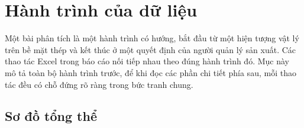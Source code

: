 \documentclass[12pt]{article}
\begin{document}
\clearpage
\section{Hành trình của dữ liệu}

Một bài phân tích là một hành trình có hướng, bắt đầu từ một hiện tượng vật lý trên bề mặt thép và kết thúc ở một quyết định của người quản lý sản xuất. Các thao tác Excel trong báo cáo nối tiếp nhau theo đúng hành trình đó. Mục này mô tả toàn bộ hành trình trước, để khi đọc các phần chi tiết phía sau, mỗi thao tác đều có chỗ đứng rõ ràng trong bức tranh chung.

\subsection{Sơ đồ tổng thể}
\end{document}

